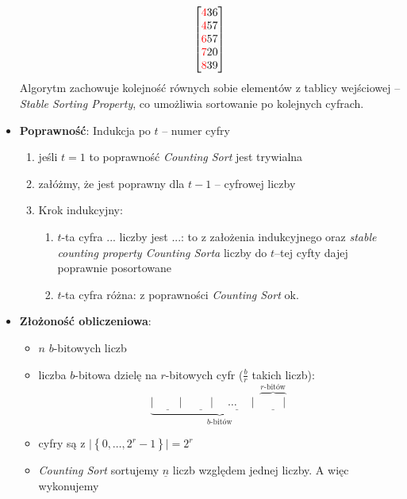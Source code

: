 \documentclass[11pt,a4paper]{article}
\begin{document}
\begin{itemize}
\[\begin{bmatrix}
                \textcolor{red}{4}36 \\
                \textcolor{red}{4}57 \\
                \textcolor{red}{6}57 \\
                \textcolor{red}{7}20 \\
                \textcolor{red}{8}39
            \end{bmatrix}
        \]
        Algorytm zachowuje kolejność równych sobie elementów z tablicy wejściowej -- \textit{Stable Sorting Property}, co umożliwia sortowanie po kolejnych cyfrach.
    \item \textbf{Poprawność}: Indukcja po $t$ -- numer cyfry
        \begin{enumerate}
            \item jeśli $t=1$ to poprawność \textit{Counting Sort} jest trywialna
            \item załóżmy, że  jest poprawny dla $t-1$ -- cyfrowej liczby
            \item Krok indukcyjny:
                \begin{enumerate}
                    \item $t$-ta cyfra ... liczby jest ...:
                        to z założenia indukcyjnego oraz \textit{stable counting property Counting Sorta} liczby do $t$--tej cyfty dajej poprawnie posortowane
                    \item $t$-ta cyfra różna: z poprawności \textit{Counting Sort} ok.
                \end{enumerate}
        \end{enumerate}
    \item \textbf{Złożoność obliczeniowa}:
        \begin{itemize}
            \item $n$ $b$-bitowych liczb
            \item liczba $b$-bitowa dzielę na $r$-bitowych cyfr ($\frac{b}{r}$ takich liczb):
                \[
                    \underbrace{\underline{\mid \quad \quad \mid} \underline{\quad \quad \mid} \underline{ \quad \dots \quad \mid} \overbrace{\underline{\quad \quad \mid}}^{r\text{-bitów}}}_{b\text{-bitów}}
                \]
            \item cyfry są z $\mid \left\{ 0,\dots,2^r -1\right\} \mid = 2^r$
            \item \textit{Counting Sort} sortujemy $\underline{n}$ liczb względem jednej liczby. A więc wykonujemy

\end{itemize}
\end{itemize}
\end{document}
